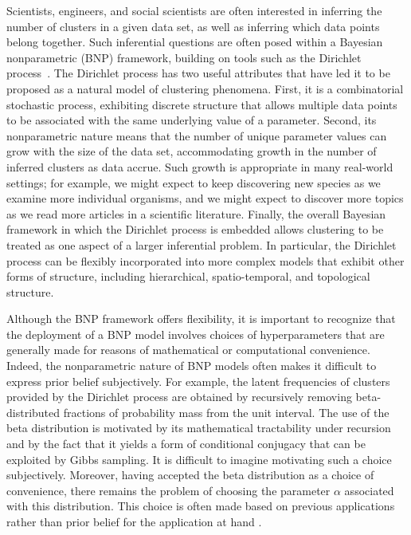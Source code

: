 Scientists, engineers, and social scientists are often interested in inferring
the number of clusters in a given data set, as well as inferring which data points
belong together. Such inferential questions are often posed within a Bayesian
nonparametric (BNP) framework, building on tools such as the Dirichlet
process~\citep{ferguson:1973:bayesian, sethuraman:1994:constructivedp}.
The Dirichlet process has two useful attributes that have led it to be proposed
as a natural model of clustering phenomena.  First, it is a combinatorial stochastic
process, exhibiting discrete structure that allows multiple data points to be associated
with the same underlying value of a parameter.  Second, its nonparametric nature means
that the number of unique parameter values can grow with the size of the data set, 
accommodating growth in the number of inferred clusters as data accrue.  Such growth
is appropriate in many real-world settings; for example, we might expect to keep
discovering new species as we examine more individual organisms, and we might
expect to discover more topics as we read more articles in a scientific literature.
Finally, the overall Bayesian framework in which the Dirichlet process is embedded
allows clustering to be treated as one aspect of a larger inferential problem.  In
particular, the Dirichlet process can be flexibly incorporated into more complex models
that exhibit other forms of structure, including hierarchical, spatio-temporal, and
topological structure. 

Although the BNP framework offers flexibility, it is important to recognize
that the deployment of a BNP model involves choices of hyperparameters that are
generally made for reasons of mathematical or computational convenience.  Indeed,
the nonparametric nature of BNP models often makes it difficult to express prior
belief subjectively.  For example, the latent frequencies of clusters provided by
the Dirichlet process are obtained by recursively removing beta-distributed fractions
of probability mass from the unit interval. The use of the beta distribution is
motivated by its mathematical tractability under recursion and by the fact that it
yields a form of conditional conjugacy that can be exploited by Gibbs sampling.
It is difficult to imagine motivating such a choice subjectively.  Moreover, having
accepted the beta distribution as a choice of convenience, there remains the problem
of choosing the parameter $\alpha$ associated with this distribution.  This choice
is often made based on previous applications rather than prior belief for the application
at hand \citep[Chapter 23]{teh:2006:hdp, gelman:2013:bda}.

